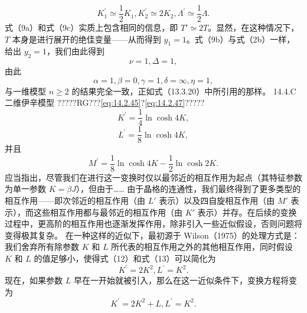 \begin{equation}\tag{14.4.10}\label{eq:14.4.10}
K _ { 1 } ^{\prime} \simeq \frac { 1 } { 2 } K _ { 1 } ,  K _ { 2 } ^{\prime} \simeq 2 K _ { 2 } ,  \Lambda ^{\prime} \simeq \frac { 1 } { 2 } \Lambda .
\end{equation}
式（9a）和式（9c）实质上包含相同的信息，即 \(T' \simeq 2T\)。显然，在这种情况下，\(T\) 本身是进行展开的绝佳变量——从而得到 \(y_1 = 1\)。式（9b）与式（2b）一样，给出 \(y_2 = 1\)，我们由此得到
\begin{equation}\tag{14.4.11}\label{eq:14.4.11}
\nu = 1 ,  \Delta = 1 ,
\end{equation}
由此
\begin{equation}\tag{14.4.12}\label{eq:14.4.12}
\alpha = 1 ,  \beta = 0 ,  \gamma = 1 ,  \delta = \infty ,  \eta = 1 ,
\end{equation}
与一维模型 \(n \geq 2\) 的结果完全一致，正如式（13.3.20）中所引用的那样。
14.4.C 二维伊辛模型
?????RG???\autoref{eq:14.2.45}?\autoref{eq:14.2.47}?????
\begin{equation}\tag{14.4.13}\label{eq:14.4.13}
K ^{\prime} = \frac { 1 } { 4 } \ln \cosh 4 K ,
\end{equation}
\begin{equation}\tag{14.4.14}\label{eq:14.4.14}
L ^{\prime} = \frac { 1 } { 8 } \ln \cosh 4 K ,
\end{equation}
并且
\begin{equation}\tag{14.4.15}\label{eq:14.4.15}
M ^{\prime} = { \frac { 1 } { 8 } } \ln \cosh 4 K - { \frac { 1 } { 2 } } \ln \cosh 2 K .
\end{equation}
应当指出，尽管我们在进行这一变换时仅以最邻近的相互作用为起点（其特征参数为单一参数 \(K=\beta J\)），但由于\ldots\ldots{}
由于晶格的连通性，我们最终得到了更多类型的相互作用——即次邻近的相互作用（由 \(L'\) 表示）以及四自旋相互作用（由 \(M'\) 表示），而这些相互作用都与最邻近的相互作用（由 \(K'\) 表示）并存。在后续的变换过程中，更高阶的相互作用也逐渐发挥作用，除非引入一些近似假设，否则问题将变得极其复杂。
在一种这样的近似下，最初源于 Wilson（1975）的处理方式是：我们舍弃所有除参数 \(K\) 和 \(L\) 所代表的相互作用之外的其他相互作用，同时假设 \(K\) 和 \(L\) 的值足够小，使得式（12）和式（13）可以简化为
\begin{equation}\tag{14.4.16}\label{eq:14.4.16}
K ^{\prime} = 2 K ^{2} ,  L ^{\prime} = K ^{2} .
\end{equation}
现在，如果参数 \(L\) 早在一开始就被引入，那么在这一近似条件下，变换方程将变为
\begin{equation}\tag{14.4.17}\label{eq:14.4.17}
K ^{\prime} = 2 K ^{2} + L ,  L ^{\prime} = K ^{2} .
\end{equation}
